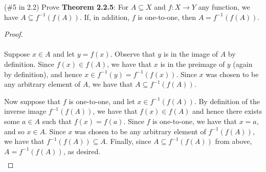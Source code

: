 (\#5 in 2.2) Prove \textbf{Theorem 2.2.5}: For $A\subseteq X$ and
$f:X\to Y$ any function, we have $A\subseteq f^{-1}(f(A))$. If, in addition, 
$f$ is one-to-one, then $A=f^{-1}(f(A))$.

\begin{proof}\ \\\\
    Suppose $x \in A$ and let $y = f(x)$. Observe that $y$ is in the image of
    $A$ by definition. Since $f(x) \in f(A)$, we have that $x$ is in the
    preimage of $y$ (again by definition), and hence
    $x \in f^{-1}{(y)} = f^{-1}{\left(f(x)\right)}$. Since $x$ was chosen to be
    any arbitrary element of $A$, we have that
    $A \subseteq f^{-1}{\left(f(A)\right)}$.

    Now suppose that $f$ is one-to-one, and let
    $x \in f^{-1}{\left(f(A)\right)}$. By definition of the inverse image
    $f^{-1}{\left(f(A)\right)}$, we have that $f(x) \in f(A)$ and hence there exists some $a \in A$
    such that $f(x) = f(a)$. Since $f$ is one-to-one, we have that $x = a$, and
    so $x \in A$. Since $x$ was chosen to be any arbitrary element of 
    $f^{-1}{\left(f(A)\right)}$, we have that
    $f^{-1}{\left(f(A)\right)} \subseteq A$. Finally, since 
    $A \subseteq f^{-1}{\left(f(A)\right)}$ from above, 
    $A = f^{-1}{\left(f(A)\right)}$, as desired.
    \begin{align*}
    \end{align*}
\end{proof}